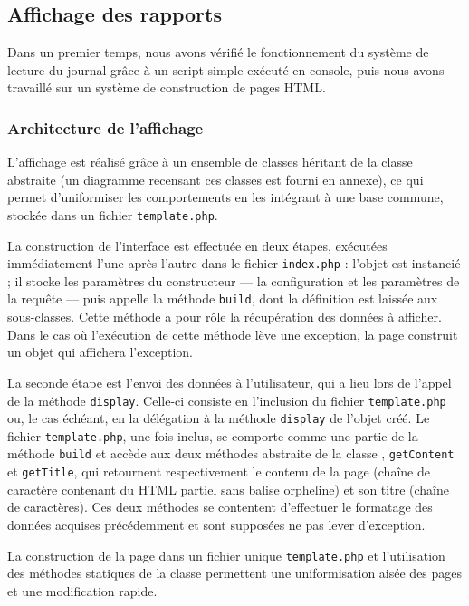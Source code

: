 \subsection{Affichage des rapports}

Dans un premier temps, nous avons vérifié le fonctionnement du système de lecture du journal grâce à un script simple exécuté en console, puis nous avons travaillé sur un système de construction de pages HTML.

\subsubsection{Architecture de l’affichage}

L’affichage est réalisé grâce à un ensemble de classes héritant de la classe abstraite  (un diagramme recensant ces classes est fourni en annexe), ce qui permet d’uniformiser les comportements en les intégrant à une base commune, stockée dans un fichier \texttt{template.php}.

La construction de l’interface est effectuée en deux étapes, exécutées immédiatement l’une après l’autre dans le fichier \texttt{index.php} : l’objet  est instancié ; il stocke les paramètres du constructeur — la configuration et les paramètres de la requête — puis appelle la méthode \texttt{build}, dont la définition est laissée aux sous-classes. Cette méthode a pour rôle la récupération des données à afficher. Dans le cas où l’exécution de cette méthode lève une exception, la page construit un objet  qui affichera l’exception.

La seconde étape est l’envoi des données à l’utilisateur, qui a lieu lors de l’appel de la méthode \texttt{display}. Celle-ci consiste en l’inclusion du fichier \texttt{template.php} ou, le cas échéant, en la délégation à la méthode \texttt{display} de l’objet  créé. Le fichier \texttt{template.php}, une fois inclus, se comporte comme une partie de la méthode \texttt{build} et accède aux deux méthodes abstraite de la classe , \texttt{getContent} et \texttt{getTitle}, qui retournent respectivement le contenu de la page (chaîne de caractère contenant du HTML partiel sans balise orpheline) et son titre (chaîne de caractères). Ces deux méthodes se contentent d’effectuer le formatage des données acquises précédemment et sont supposées ne pas lever d’exception.

La construction de la page dans un fichier unique \texttt{template.php} et l’utilisation des méthodes statiques de la classe  permettent une uniformisation aisée des pages et une modification rapide.

